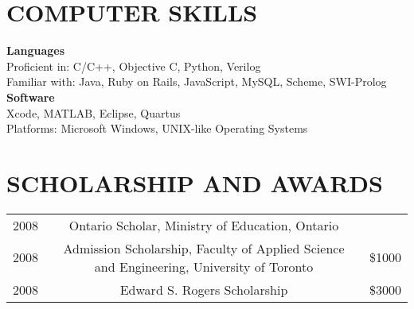 \documentclass{res}
\begin{document}
\begin{resume}
\section{COMPUTER SKILLS}          
    {\bf Languages}\\Proficient in: C/C++, Objective C, Python, Verilog\\
    Familiar with: Java, Ruby on Rails, JavaScript, MySQL, Scheme, SWI-Prolog\\
    {\bf Software}\\Xcode, MATLAB, Eclipse, Quartus\\
    Platforms: Microsoft Windows\textregistered, UNIX-like Operating Systems
 
\section{SCHOLARSHIP AND AWARDS}          
    \begin{tabular} {l c r}
      2008 & Ontario Scholar, Ministry of Education, Ontario & \\
      2008 & Admission Scholarship, Faculty of Applied Science and Engineering, University of Toronto & \$1000 \\
      2008 & Edward S. Rogers Scholarship & \$3000 \\
    \end{tabular}
 
 
\end{resume}
\end{document}
